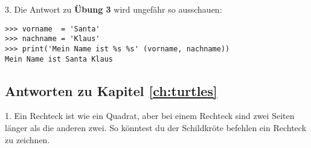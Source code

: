 \noindent
3. Die Antwort zu \textbf{Übung 3} wird ungefähr so ausschauen:

\begin{listing}
\begin{verbatim}
>>> vorname  = 'Santa'
>>> nachname = 'Klaus'
>>> print('Mein Name ist %s %s' (vorname, nachname))
Mein Name ist Santa Klaus
\end{verbatim}
\end{listing}

\subsection*{Antworten zu Kapitel \ref{ch:turtles}}

\noindent
1. Ein Rechteck ist wie ein Quadrat, aber bei einem Rechteck sind zwei Seiten länger als die anderen zwei. So könntest du der Schildkröte befehlen ein Rechteck zu zeichnen.

